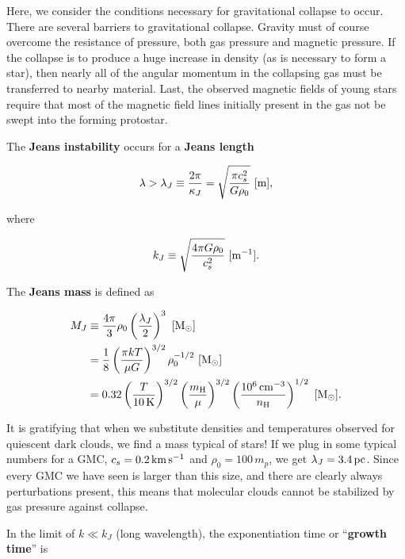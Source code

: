 \documentclass[a4paper,10pt]{article}
\begin{document}
{\noindent}Here, we consider the conditions necessary for gravitational collapse to occur. There are several barriers to gravitational collapse. Gravity must of course overcome the resistance of pressure, both gas pressure and magnetic pressure. If the collapse is to produce a huge increase in density (as is necessary to form a star), then nearly all of the angular momentum in the collapsing gas must be transferred to nearby material. Last, the observed magnetic fields of young stars require that most of the magnetic field lines initially present in the gas not be swept into the forming protostar.

{\noindent}The \textbf{Jeans instability} occurs for a \textbf{Jeans length}

\begin{align*}
    \lambda > \lambda_J \equiv \frac{2\pi}{\kappa_J} = \sqrt{\frac{\pi c_s^2}{G\rho_0}} ~ [{\rm m}],
\end{align*}

{\noindent}where

\begin{align*}
    k_J \equiv \sqrt{\frac{4\pi G\rho_0}{c_s^2}} ~ [{\rm m^{-1}}].
\end{align*}

{\noindent}The \textbf{Jeans mass} is defined as

\begin{align*}
    M_J &\equiv \frac{4\pi}{3}\rho_0 \left(\frac{\lambda_J}{2}\right)^3 ~ [{\rm M_\odot}] \\
        &= \frac{1}{8} \left(\frac{\pi kT}{\mu G}\right)^{3/2} \rho_0^{-1/2} ~ [{\rm M_\odot}] \\
        &= 0.32 \left(\frac{T}{10\,{\rm K}}\right)^{3/2} \left(\frac{m_{\rm H}}{\mu}\right)^{3/2} \left(\frac{10^6\,{\rm cm^{-3}}}{n_{\rm H}}\right)^{1/2}  ~ [{\rm M_\odot}].
\end{align*}

{\noindent}It is gratifying that when we substitute densities and temperatures observed for quiescent dark clouds, we find a mass typical of stars! If we plug in some typical numbers for a GMC, $c_s=0.2\,{\rm km\,s^{-1}}$ and $\rho_0=100\,m_p$, we get $\lambda_J=3.4\,{\rm pc}$. Since every GMC we have seen is larger than this size, and there are clearly always perturbations present, this means that molecular clouds cannot be stabilized by gas pressure against collapse. 

{\noindent}In the limit of $k\ll k_J$ (long wavelength), the exponentiation time or ``\textbf{growth time}'' is
\end{document}
